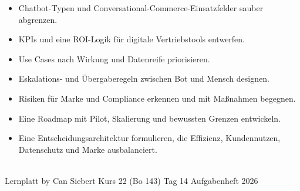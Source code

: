 \documentclass[11pt,a4paper,oneside]{article}
\begin{document}
\medskip
\begin{infobox}
\begin{itemize}
  \item Chatbot-Typen und Conversational-Commerce-Einsatzfelder sauber abgrenzen.
  \item KPIs und eine ROI-Logik für digitale Vertriebstools entwerfen.
  \item Use Cases nach Wirkung und Datenreife priorisieren.
  \item Eskalations- und Übergaberegeln zwischen Bot und Mensch designen.
  \item Risiken für Marke und Compliance erkennen und mit Maßnahmen begegnen.
  \item Eine Roadmap mit Pilot, Skalierung und bewussten Grenzen entwickeln.
  \item Eine Entscheidungsarchitektur formulieren, die Effizienz, Kundennutzen, Datenschutz und Marke ausbalanciert.
\end{itemize}
\end{infobox}

\vspace{1cm}
\noindent{\color{lpAccent}\rule{\linewidth}{0.6pt}}\\[4pt]
{\footnotesize\sffamily\color{lpGray}Lernplatt \textperiodcentered{} by Can Siebert \textperiodcentered{} Kurs 22 (Bo 143) \textperiodcentered{} Tag 14 \textperiodcentered{} Aufgabenheft \textperiodcentered{} \textcopyright{} 2026}
\end{document}
